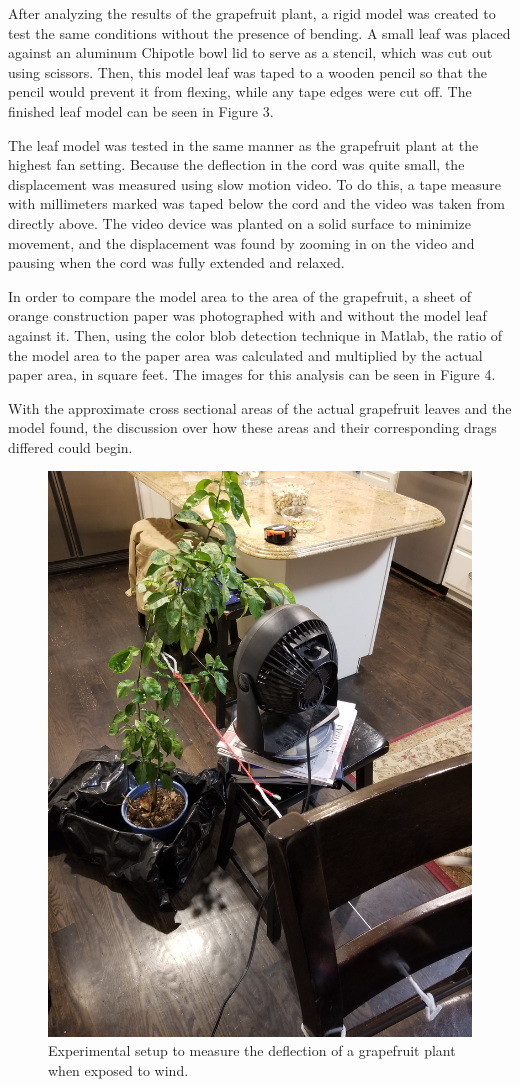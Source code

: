 \documentclass{article}
\begin{document}
After analyzing the results of the grapefruit plant, a rigid model was created to test the same conditions without the presence of bending. A small leaf was placed against an aluminum Chipotle bowl lid to serve as a stencil, which was cut out using scissors. Then, this model leaf was taped to a wooden pencil so that the pencil would prevent it from flexing, while any tape edges were cut off. The finished leaf model can be seen in 
Figure 3.

The leaf model was tested in the same manner as the grapefruit plant at the highest fan setting. Because the deflection in the cord was quite small, the displacement was measured using slow motion video. To do this, a tape measure with millimeters marked was taped below the cord and the video was taken from directly above. The video device was planted on a solid surface to minimize movement, and the displacement was found by zooming in on the video and pausing when the cord was fully extended and relaxed. 

In order to compare the model area to the area of the grapefruit, a sheet of orange construction paper was photographed with and without the model leaf against it. Then, using the color blob detection technique in Matlab, the ratio of the model area to the paper area was calculated and multiplied by the actual paper area, in square feet. The images for this analysis can be seen in Figure 4.

With the approximate cross sectional areas of the actual grapefruit leaves and the model found, the discussion over how these areas and their corresponding drags differed could begin.


\begin{figure}
\begin{center}
\includegraphics[width=0.5\columnwidth]{Grapefruit_Setup.jpg} 
\end{center}
\caption{Experimental setup to measure the deflection of a grapefruit plant when exposed to wind.}
\label{fig:methods1}
\end{figure}
\end{document}
